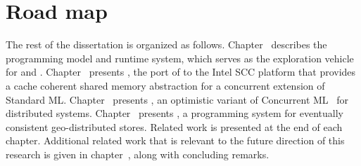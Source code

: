 \section{Road map}

The rest of the dissertation is organized as follows. Chapter~\cite{chap:mm}
describes the \MM programming model and runtime system, which serves as the
exploration vehicle for \MMSCC and \rxcml. Chapter~\cite{chap:aneris} presents
\MMSCC, the port of \MM to the Intel SCC platform that provides a cache
coherent shared memory abstraction for a concurrent extension of Standard ML.
Chapter~\cite{chap:rxcml} presents \rxcml, an optimistic variant of Concurrent
ML~\cite{Reppy09} for distributed systems. Chapter~\cite{chap:quelea} presents
\quelea, a programming system for eventually consistent geo-distributed stores.
Related work is presented at the end of each chapter. Additional related work
that is relevant to the future direction of this research is given in
chapter~\cite{chap:conclusion}, along with concluding remarks.
